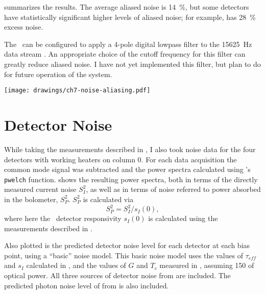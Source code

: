  summarizes the results.
The average aliased noise is \SI{14}{\percent}, but some detectors have statistically significant higher levels of aliased noise; for example,  has \SI{28}{\percent} excess noise.

The \MCE\ can be configured to apply a 4-pole digital lowpass filter to the \SI{15625}{\Hz} data stream \cite{mce_team_digital_????}.
An appropriate choice of the cutoff frequency for this filter can greatly reduce aliased noise.
I have not yet implemented this filter, but plan to do for future operation of the system.

\begin{figure*}
  \centering
\texttt{[image: drawings/ch7-noise-aliasing.pdf]}
\caption{%
\textbf{Left}
Plot showing fractional excess noise (see text for definition) due to noise aliasing for all rows of column 0.
The error bars are for \SI{95}{\percent} confidence intervals, and the average excess noise is \SI{14}{\percent}.
\textbf{Right}
Sample power spectra at \SI{3125}{\hertz} and \SI{15625}{\hertz} for .
For this detector the excess noise is \SI{17}{\percent}.
}
\label{fig:ch7-noise-aliasing}
\end{figure*}

\section{Detector Noise} \label{sec:det-noise}

While taking the measurements described in , I also took noise data for the four detectors with working heaters on column 0.
For each data acquisition the common mode signal was subtracted and the power spectra calculated using \MATLAB's \texttt{pwelch} function.
 shows the resulting power spectra, both in terms of the directly measured current noise $S^2_I$, as well as in terms of noise referred to power absorbed in the bolometer, $S^2_{P}$.
$S^2_{P}$ is calculated via
\begin{equation}
 S^2_{P} = S^2_I / s_I(0),
\end{equation}
where here the \DC\ detector responsivity $s_I(0)$ is calculated using the measurements described in .

Also plotted is the predicted detector noise level for each detector at each bias point, using a ``basic'' noise model.
This basic noise model uses the values of $\tau_{eff}$ and $s_I$ calculated in , and the values of $G$ and $T_c$ measured in , assuming \SI{150}{\pW} of optical power.
All three sources of detector noise from  are included.
The predicted photon noise level of  from  is also included.


